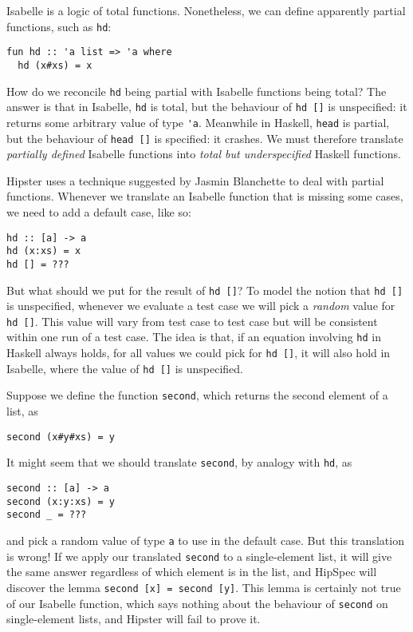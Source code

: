 Isabelle is a logic of total functions. Nonetheless, we can define
apparently partial functions, such as \verb|hd|:
\begin{verbatim}
fun hd :: 'a list => 'a where
  hd (x#xs) = x
\end{verbatim}

How do we reconcile \verb|hd| being partial with Isabelle functions
being total? The answer is that in Isabelle, \verb|hd| is total, but
the behaviour of \verb|hd []| is unspecified: it returns some
arbitrary value of type \verb|'a|. Meanwhile in Haskell, \verb|head|
is partial, but the behaviour of \verb|head []| is specified: it
crashes. We must therefore translate \emph{partially defined} Isabelle
functions into \emph{total but underspecified} Haskell functions.

Hipster uses a technique suggested by Jasmin Blanchette
\cite{blanchettification} to deal with partial functions. Whenever we translate an Isabelle function
that is missing some cases, we need to add a default case, like so:
\begin{verbatim}
hd :: [a] -> a
hd (x:xs) = x
hd [] = ???
\end{verbatim}

But what should we put for the result of \verb|hd []|? To model the
notion that \verb|hd []| is unspecified, whenever we evaluate a test
case we will pick a \emph{random} value for \verb|hd []|. This value
will vary from test case to test case but will be consistent within
one run of a test case. The idea is that, if an equation involving
\verb|hd| in Haskell always holds, for all values we could pick for \verb|hd []|,
it will also hold in Isabelle, where the value of \verb|hd []| is unspecified.

Suppose we define the function \verb|second|, which returns the second
element of a list, as
\begin{verbatim}
second (x#y#xs) = y
\end{verbatim}
It might seem that we should translate \verb|second|, by analogy with \verb|hd|, as
\begin{verbatim}
second :: [a] -> a
second (x:y:xs) = y
second _ = ???
\end{verbatim}
and pick a random value of type \verb|a| to use in the default case.
But this translation is wrong! If we apply our translated \verb|second|
to a single-element list, it will give the same answer regardless of which
element is in the list, and HipSpec will discover the lemma
\verb|second [x] = second [y]|. This lemma is certainly not true of our
Isabelle function, which says nothing about the behaviour
of \verb|second| on single-element lists, and Hipster will fail to
prove it.

